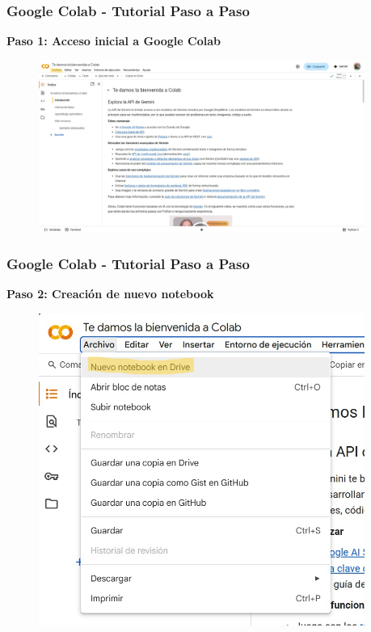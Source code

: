 \documentclass[10pt]{beamer}
\begin{document}
\begin{frame}
  \frametitle{Google Colab - Tutorial Paso a Paso}
  \begin{center}
    \textbf{Paso 1: Acceso inicial a Google Colab}
  \end{center}
  \begin{figure}
    \includegraphics[width=0.95\textwidth]{2) Colab/GColab01.png}
  \end{figure}
\end{frame}

\begin{frame}
  \frametitle{Google Colab - Tutorial Paso a Paso}
  \begin{center}
    \textbf{Paso 2: Creación de nuevo notebook}
  \end{center}
  \begin{figure}
    \includegraphics[width=0.95\textwidth]{2) Colab/GColab02.png}
  \end{figure}
\end{frame}
\end{document}

